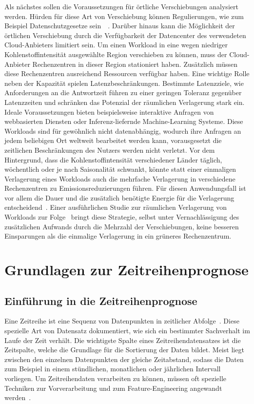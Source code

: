 Als nächstes sollen die Voraussetzungen für örtliche Verschiebungen analysiert werden.
Hürden für diese Art von Verschiebung können Regulierungen, wie zum Beispiel Datenschutzgesetze sein~\cite{Sukprasert.2023}~\cite{Koningstein.18.5.2021}.
Darüber hinaus kann die Möglichkeit der örtlichen Verschiebung durch die Verfügbarkeit der Datencenter des verwendeten Cloud-Anbieters limitiert sein.
Um einen Workload in eine wegen niedriger Kohlenstoffintensität ausgewählte Region verschieben zu können, muss der Cloud-Anbieter Rechenzentren in dieser Region stationiert haben.
Zusätzlich müssen diese Rechenzentren ausreichend Ressourcen verfügbar haben.
Eine wichtige Rolle neben der Kapazität spielen Latenzbeschränkungen.
Bestimmte Latenzziele, wie Anforderungen an die Antwortzeit führen zu einer geringen Toleranz gegenüber Latenzzeiten und schränken das Potenzial der räumlichen Verlagerung stark ein.
Ideale Voraussetzungen bieten beispielsweise interaktive Anfragen von webbasierten Diensten oder Inferenz-liefernde Machine-Learning Systeme.
Diese Workloads sind für gewöhnlich nicht datenabhängig, wodurch ihre Anfragen an jedem beliebigen Ort weltweit bearbeitet werden kann, vorausgesetzt die zeitlichen Beschränkungen des Nutzers werden nicht verletzt.
Vor dem Hintergrund, dass die Kohlenstoffintensität verschiedener Länder täglich, wöchentlich oder je nach Saisonalität schwankt, könnte statt einer einmaligen Verlagerung eines Workloads auch die mehrfache Verlagerung in verschiedene Rechenzentren zu Emissionsreduzierungen führen.
Für diesen Anwendungsfall ist vor allem die Dauer und die zusätzlich benötigte Energie für die Verlagerung entscheidend~\cite{Sukprasert.2023}.
Einer ausführlichen Studie zur räumlichen Verlagerung von Workloads zur Folge~\cite{Sukprasert.2023} bringt diese Strategie, selbst unter Vernachlässigung des zusätzlichen Aufwands durch die Mehrzahl der Verschiebungen, keine besseren Einsparungen als die einmalige Verlagerung in ein grüneres Rechenzentrum.
\chapter{Grundlagen zur Zeitreihenprognose}
\section{Einführung in die Zeitreihenprognose}\label{CAP:intor-time-series-forecasting}
Eine Zeitreihe ist eine Sequenz von Datenpunkten in zeitlicher Abfolge~\cite{Peixeiro.2022}.
Diese spezielle Art von Datensatz dokumentiert, wie sich ein bestimmter Sachverhalt im Laufe der Zeit verhält.
Die wichtigste Spalte eines Zeitreihendatensatzes ist die Zeitspalte, welche die Grundlage für die Sortierung der Daten bildet.
Meist liegt zwischen den einzelnen Datenpunkten der gleiche Zeitabstand, sodass die Daten zum Beispiel in einem stündlichen, monatlichen oder jährlichen Intervall vorliegen.
Um Zeitreihendaten verarbeiten zu können, müssen oft spezielle Techniken zur Vorverarbeitung und zum Feature-Engineering angewandt werden~\cite{Lazzeri.2021}.

